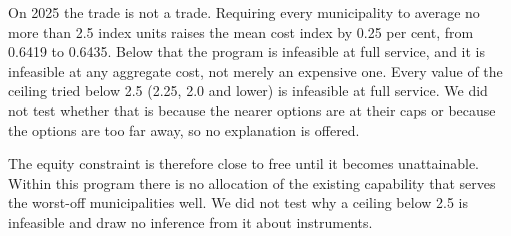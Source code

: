 On 2025 the trade is not a trade. Requiring every municipality to average no more
than 2.5 index units raises the mean cost index by 0.25 per cent, from 0.6419 to 0.6435. Below that the program is infeasible at full service, and
it is infeasible at any aggregate cost, not merely an expensive one. Every
value of the ceiling tried below 2.5 (2.25, 2.0 and lower) is infeasible at full service. We did not
test whether that is because the nearer options are at their caps or because the options are too
far away, so no explanation is offered.

The equity constraint is therefore close to free until it becomes unattainable. Within this program there is no allocation of the existing capability that serves the worst-off municipalities well. We did not test why a ceiling below 2.5 is infeasible and draw no inference from it about instruments.

